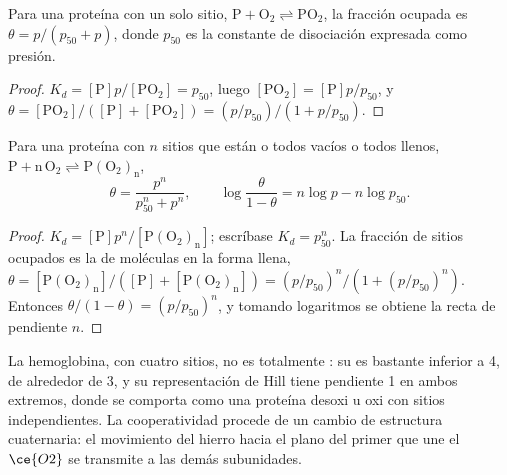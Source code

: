 \begin{proposition}\label{prop:b3:bioinorganic:hyperbola}
Para una proteína con un solo sitio, $\mathrm{P + O_2 \rightleftharpoons PO_2}$, la fracción ocupada es $\theta = p/(p_{50} + p)$, donde $p_{50}$ es
la constante de disociación expresada como presión.
\end{proposition}

\begin{proof}
$K_d = [\mathrm P]p/[\mathrm{PO_2}] = p_{50}$, luego $[\mathrm{PO_2}] = [\mathrm P]p/p_{50}$, y $\theta = [\mathrm{PO_2}]/([\mathrm P] + [\mathrm{PO_2}]) = (p/p_{50})/(1 + p/p_{50})$.
\end{proof}

\begin{theorem}\label{thm:b3:bioinorganic:hill}
Para una proteína con $n$ sitios que están o todos vacíos o todos llenos,
$\mathrm{P + n\,O_2 \rightleftharpoons P(O_2)_n}$,
\[
  \theta = \frac{p^n}{p_{50}^n + p^n}, \qquad \log\frac{\theta}{1 - \theta} = n\log p - n\log p_{50}.
\]
\end{theorem}

\begin{proof}
$K_d = [\mathrm P]p^n/[\mathrm{P(O_2)_n}]$; escríbase $K_d = p_{50}^n$. La fracción de sitios ocupados es la de moléculas
en la forma llena, $\theta = [\mathrm{P(O_2)_n}]/([\mathrm P] + [\mathrm{P(O_2)_n}]) = (p/p_{50})^n/(1 + (p/p_{50})^n)$. Entonces $\theta/(1 - \theta) = (p/p_{50})^n$, y tomando
logaritmos se obtiene la recta de pendiente $n$.
\end{proof}

La hemoglobina, con cuatro sitios, no es totalmente : su  es
bastante inferior a 4, de alrededor de 3, y su representación de Hill tiene pendiente 1 en ambos extremos, donde
se comporta como una proteína desoxi u oxi con sitios independientes. La
cooperatividad procede de un cambio de estructura cuaternaria: el movimiento del
hierro hacia el plano del primer  que une el $\ce{O2}$ se transmite a las demás subunidades.

